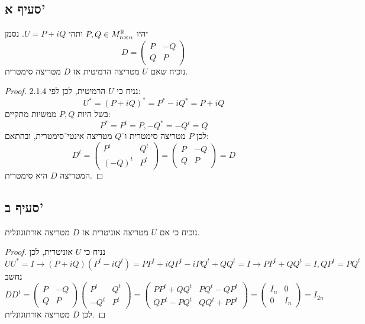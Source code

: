\subsection{סעיף א'}
יהיו $P, Q \in M^{\mathbb{R}}_{n \times n}$ ותהי $U = P + iQ$. נסמן
\[
	D = \begin{pmatrix}
		P & -Q \\
		Q & P
	\end{pmatrix}
\]
נוכיח שאם $U$ מטריצה הרמיטית אז $D$ מטריצה סימטרית.
\begin{proof}
	נניח כי $U$ הרמיטית, לכן לפי 2.1.4:
	\[
		U^* = {(P + iQ)}^* = P^* - i Q^* = P + i Q
	\]
	בשל היות $P, Q$ ממשיות מתקיים:
	\[
		P^* = P^t = P, -Q^* = -Q^t = Q
	\]
	לכן $P$ מטריצה סימטרית ו־$Q$ מטריצה אינטי־סימטרית, ובהתאם:
	\[
		D^t = \begin{pmatrix}
			P^t & Q^t \\
			{(-Q)}^t & P^t
		\end{pmatrix}
		= \begin{pmatrix}
			P & -Q \\
			Q & P
		\end{pmatrix}
		= D
	\]
	המטריצה $D$ היא סימטרית.
\end{proof}

\subsection{סעיף ב'}
נוכיח כי אם $U$ מטריצה אוניטרית אז $D$ מטריצה אורתוגונלית.
\begin{proof}
	נניח כי $U$ אוניטרית, לכן
	\[
		U U^* = I \rightarrow (P + i Q)(P^t - i Q^t) = P P^t + i Q P^t - i P Q^t + Q Q^t = I \rightarrow PP^t + QQ^t = I, QP^t = PQ^t
	\]
	נחשב
	\[
		D D^t
		= \begin{pmatrix}
			P & -Q \\
			Q & P
		\end{pmatrix} \begin{pmatrix}
			P^t & Q^t \\
			-Q^t & P^t
		\end{pmatrix}
		= \begin{pmatrix}
			PP^t + QQ^t & PQ^t - QP^t \\
			QP^t - PQ^t & QQ^t + PP^t
		\end{pmatrix}
		= \begin{pmatrix}
			I_n & 0 \\
			0 & I_n
		\end{pmatrix}
		= I_{2n}
	\]
	לכן $D$ מטריצה אורתוגונלית.
\end{proof}

